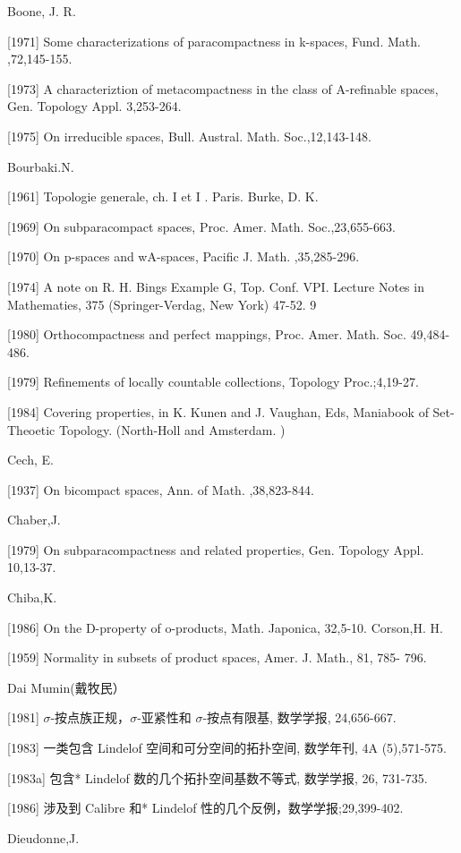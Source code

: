 \documentclass[main.tex]{subfiles}
\begin{document}
Boone, J. R.

[1971]
Some characterizations of paracompactness in k-spaces, Fund.
Math. ,72,145-155.

[1973] A characteriztion of metacompactness in the class of A-refinable
spaces, Gen. Topology Appl. 3,253-264.

[1975] On irreducible spaces, Bull. Austral. Math. Soc.,12,143-148.

\noindent Bourbaki.N.

[1961] Topologie generale, ch. I et I . Paris.
Burke, D. K.

[1969] On subparacompact spaces, Proc. Amer. Math. Soc.,23,655-663.

[1970] On p-spaces and wA-spaces, Pacific J. Math. ,35,285-296.

[1974] A note on R. H. Bings Example G, Top. Conf. VPI. Lecture Notes in
Mathematies, 375 (Springer-Verdag, New York) 47-52. 9

[1980] Orthocompactness and perfect mappings, Proc. Amer. Math. Soc.
49,484-486.

[1979] Refinements of locally countable collections, Topology Proc.;4,19-27.

[1984] Covering properties, in  K. Kunen and J. Vaughan, Eds, Maniabook of Set-Theoetic Topology. (North-Holl and Amsterdam. )

\noindent Cech, E.

[1937] On bicompact spaces, Ann. of Math. ,38,823-844.

\noindent Chaber,J.

[1979] On subparacompactness and related properties, Gen. Topology Appl.
10,13-37.

\noindent Chiba,K.

[1986] On the D-property of o-products, Math. Japonica, 32,5-10.
Corson,H. H.

[1959] Normality in subsets of product spaces, Amer. J. Math., 81, 785-
796.

\noindent Dai Mumin(戴牧民）

[1981] $\sigma$-按点族正规，$\sigma$-亚紧性和 $\sigma$-按点有限基, 数学学报, 24,656-667.

[1983] 一类包含 Lindelof 空间和可分空间的拓扑空间, 数学年刊, 4A
(5),571-575.

[1983a] 包含* Lindelof 数的几个拓扑空间基数不等式, 数学学报, 26, 731-735.

[1986] 涉及到 Calibre 和* Lindelof 性的几个反例，数学学报;29,399-402.

\noindent Dieudonne,J.
\end{document}
